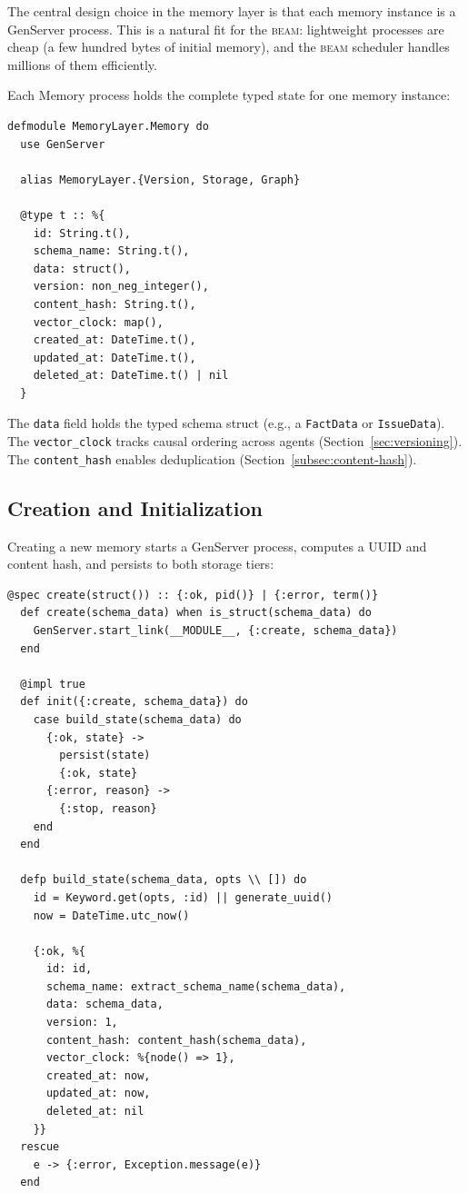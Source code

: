 \documentclass[12pt,a4paper]{article}
\theoremstyle{definition}
\newcommand{\BEAM}{\textsc{beam}}
\begin{document}
The central design choice in the memory layer is that each memory instance is a GenServer process.
This is a natural fit for the \BEAM{}: lightweight processes are cheap (a few hundred bytes of initial memory), and the \BEAM{} scheduler handles millions of them efficiently.

Each Memory process holds the complete typed state for one memory instance:

\begin{lstlisting}[caption={Memory GenServer state type.}, label={lst:memory-state}]
defmodule MemoryLayer.Memory do
  use GenServer

  alias MemoryLayer.{Version, Storage, Graph}

  @type t :: %{
    id: String.t(),
    schema_name: String.t(),
    data: struct(),
    version: non_neg_integer(),
    content_hash: String.t(),
    vector_clock: map(),
    created_at: DateTime.t(),
    updated_at: DateTime.t(),
    deleted_at: DateTime.t() | nil
  }
\end{lstlisting}

The \texttt{data} field holds the typed schema struct (e.g., a \texttt{FactData} or \texttt{IssueData}).
The \texttt{vector\_clock} tracks causal ordering across agents (Section~\ref{sec:versioning}).
The \texttt{content\_hash} enables deduplication (Section~\ref{subsec:content-hash}).

\subsection{Creation and Initialization}\label{subsec:creation}

Creating a new memory starts a GenServer process, computes a UUID and content hash, and persists to both storage tiers:

\begin{lstlisting}[caption={Memory creation: from schema struct to supervised process.}, label={lst:memory-create}]
  @spec create(struct()) :: {:ok, pid()} | {:error, term()}
  def create(schema_data) when is_struct(schema_data) do
    GenServer.start_link(__MODULE__, {:create, schema_data})
  end

  @impl true
  def init({:create, schema_data}) do
    case build_state(schema_data) do
      {:ok, state} ->
        persist(state)
        {:ok, state}
      {:error, reason} ->
        {:stop, reason}
    end
  end

  defp build_state(schema_data, opts \\ []) do
    id = Keyword.get(opts, :id) || generate_uuid()
    now = DateTime.utc_now()

    {:ok, %{
      id: id,
      schema_name: extract_schema_name(schema_data),
      data: schema_data,
      version: 1,
      content_hash: content_hash(schema_data),
      vector_clock: %{node() => 1},
      created_at: now,
      updated_at: now,
      deleted_at: nil
    }}
  rescue
    e -> {:error, Exception.message(e)}
  end
\end{lstlisting}
\end{document}
